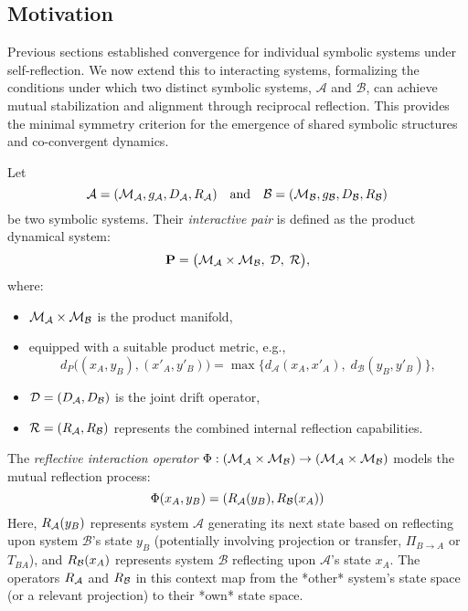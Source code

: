 \subsection{Motivation}
\label{subsec:bk7_motivation}
Previous sections established convergence for individual symbolic systems under self-reflection. We now extend this to interacting systems, formalizing the conditions under which two distinct symbolic systems, \(\mathcal{A}\) and \(\mathcal{B}\), can achieve mutual stabilization and alignment through reciprocal reflection. This provides the minimal symmetry criterion for the emergence of shared symbolic structures and co-convergent dynamics.
\begin{definition}
\label{definition:bk7_interactive_drift_reflection_pair}
Let
\[
\mathcal{A} = (\mathcal{M}_{\mathcal{A}}, g_{\mathcal{A}}, D_{\mathcal{A}}, R_{\mathcal{A}})
\quad \text{and} \quad
\mathcal{B} = (\mathcal{M}_{\mathcal{B}}, g_{\mathcal{B}}, D_{\mathcal{B}}, R_{\mathcal{B}})
\]
be two symbolic systems.
Their \emph{interactive pair} is defined as the product dynamical system:
\[
\mathbf{P} = \bigl( \mathcal{M}_{\mathcal{A}} \times \mathcal{M}_{\mathcal{B}},\; \mathcal{D},\; \mathcal{R} \bigr),
\]
where:
\begin{itemize}
  \item \( \mathcal{M}_{\mathcal{A}} \times \mathcal{M}_{\mathcal{B}} \) is the product manifold,
  \item equipped with a suitable product metric, e.g.,
  \[
  d_P\big((x_A, y_B), (x'_A, y'_B)\big) 
  = \max\big\{ d_{\mathcal{A}}(x_A, x'_A),\; d_{\mathcal{B}}(y_B, y'_B) \big\},
  \]
  \item \( \mathcal{D} = (D_{\mathcal{A}}, D_{\mathcal{B}}) \) is the joint drift operator,
  \item \( \mathcal{R} = (R_{\mathcal{A}}, R_{\mathcal{B}}) \) represents the combined internal reflection capabilities.
\end{itemize}
\end{definition}
\begin{definition}
\label{definition:bk7_reflective_interaction_operator_}
The \emph{reflective interaction operator} \(\Phi : (\mathcal{M}_{\mathcal{A}}\times\mathcal{M}_{\mathcal{B}}) \to (\mathcal{M}_{\mathcal{A}}\times\mathcal{M}_{\mathcal{B}})\) models the mutual reflection process:
\[
\Phi(x_A, y_B) = (R_{\mathcal{A}}(y_B), R_{\mathcal{B}}(x_A))
\]
Here, \(R_{\mathcal{A}}(y_B)\) represents system \(\mathcal{A}\) generating its next state based on reflecting upon system \(\mathcal{B}\)'s state \(y_B\) (potentially involving projection or transfer, \(\Pi_{B \to A}\) or \(T_{BA}\)), and \(R_{\mathcal{B}}(x_A)\) represents system \(\mathcal{B}\) reflecting upon \(\mathcal{A}\)'s state \(x_A\). The operators \(R_{\mathcal{A}}\) and \(R_{\mathcal{B}}\) in this context map from the *other* system's state space (or a relevant projection) to their *own* state space.
\end{definition}
